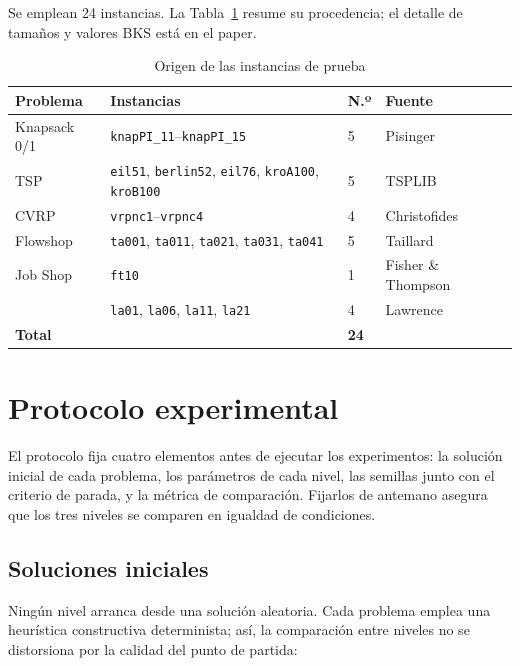 Se emplean 24 instancias. La Tabla~\ref{tab:instancias_tesis} resume su
procedencia; el detalle de tamaños y valores BKS está en el paper.

\begin{table}[H]
\centering
\caption{Origen de las instancias de prueba}
\label{tab:instancias_tesis}
\small
\begin{tabular}{llll}
\toprule
\textbf{Problema} & \textbf{Instancias} & \textbf{N.º} & \textbf{Fuente} \\
\midrule
Knapsack 0/1 & \texttt{knapPI\_11}--\texttt{knapPI\_15} & 5
             & Pisinger~\cite{pisinger2005hard} \\
TSP  & \texttt{eil51}, \texttt{berlin52}, \texttt{eil76},
       \texttt{kroA100}, \texttt{kroB100} & 5
     & TSPLIB~\cite{reinelt1991tsplib} \\
CVRP & \texttt{vrpnc1}--\texttt{vrpnc4} & 4
     & Christofides~\cite{christofides1979vehicle} \\
Flowshop & \texttt{ta001}, \texttt{ta011}, \texttt{ta021},
           \texttt{ta031}, \texttt{ta041} & 5
         & Taillard~\cite{taillard1993benchmarks} \\
Job Shop & \texttt{ft10} & 1
         & Fisher \& Thompson~\cite{fisher1963probabilistic} \\
         & \texttt{la01}, \texttt{la06}, \texttt{la11}, \texttt{la21} & 4
         & Lawrence~\cite{lawrence1984resource} \\
\midrule
\multicolumn{2}{l}{\textbf{Total}} & \textbf{24} & \\
\bottomrule
\end{tabular}
\end{table}

\section{Protocolo experimental}

El protocolo fija cuatro elementos antes de ejecutar los experimentos: la
solución inicial de cada problema, los parámetros de cada nivel, las semillas
junto con el criterio de parada, y la métrica de comparación. Fijarlos de
antemano asegura que los tres niveles se comparen en igualdad de condiciones.

\subsection{Soluciones iniciales}

Ningún nivel arranca desde una solución aleatoria. Cada problema emplea una
heurística constructiva determinista; así, la comparación entre niveles no
se distorsiona por la calidad del punto de partida:

